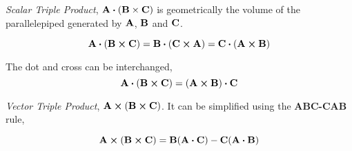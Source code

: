 \emph{Scalar Triple Product}, \(\vect{A} \dotproduct (\vect{B} \times \vect{C})\) is geometrically
the volume of the parallelepiped generated by \(\boldsymbol{\mathbf{A}}\), \(\boldsymbol{\mathbf{B}}\) and \(\boldsymbol{\mathbf{C}}\). 

\[
    \vect{A} \dotproduct (\vect{B} \cross \vect{C}) = \vect{B} \dotproduct (\vect{C} \cross \vect{A}) 
    = \vect{C} \dotproduct (\vect{A} \cross \vect{B}) 
\]

The dot and cross can be interchanged,
\[
    \vect{A} \dotproduct (\vect{B} \cross \vect{C}) = (\vect{A} \cross \vect{B}) \dotproduct \vect{C}
\]

\noindent \emph{Vector Triple Product}, \(\boldsymbol{\mathbf{A}} \cross (\boldsymbol{\mathbf{B}} \cross \boldsymbol{\mathbf{C}})\). It can
be simplified using the \textbf{ABC-CAB} rule,

\[
    \vect{A} \cross (\vect{B} \cross \vect{C}) = \vect{B}(\vect{A} \dotproduct \vect{C}) -
    \vect{C}(\vect{A} \dotproduct \vect{B})
\]



